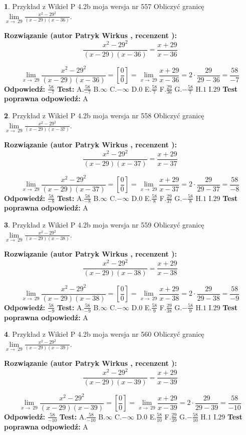 \documentclass[12pt, a4paper]{article}
\theoremstyle{definition} %
\newtheorem{zad}{}
\newcommand{\zadStart}[1]{\begin{zad}#1\newline}
\newcommand{\zadStop}{\end{zad}}
\newcommand{\rozwStart}[2]{\noindent \textbf{Rozwiązanie (autor #1 , recenzent #2): }\newline}
\newcommand{\rozwStop}{\newline}
\newcommand{\odpStart}{\noindent \textbf{Odpowiedź:}\newline}
\newcommand{\odpStop}{\newline}
\newcommand{\testStart}{\noindent \textbf{Test:}\newline}
\newcommand{\testStop}{\newline}
\newcommand{\kluczStart}{\noindent \textbf{Test poprawna odpowiedź:}\newline}
\newcommand{\kluczStop}{\newline}
\begin{document}
\zadStart{Przykład z Wikieł P 4.2b moja wersja nr 557}
Obliczyć granicę $\lim\limits_{x\to\ 29}\frac{x^{2}-29^{2}}{(x-29)(x-36)}$.
\zadStop
\rozwStart{Patryk Wirkus}{}
$$\frac{x^{2}-29^{2}}{(x-29)(x-36)}=\frac{x+29}{x-36}$$

$$\lim\limits_{x\to\ 29}\frac{x^{2}-29^{2}}{(x-29)(x-36)}=[\frac{0}{0}]=\lim\limits_{x\to\ 29}\frac{x+29}{x-36}=2 \cdot \frac{29}{29-36} = \frac{58}{-7}$$
\rozwStop
\odpStart
$\frac{58}{-7}$
\odpStop
\testStart
A.$\frac{58}{-7}$
B.$\infty$
C.$-\infty$
D.$0$
E.$\frac{58}{7}$
F.$\frac{29}{36}$
G.$-\frac{58}{7}$
H.$1$
I.$29$
\testStop
\kluczStart
A
\kluczStop



\zadStart{Przykład z Wikieł P 4.2b moja wersja nr 558}
Obliczyć granicę $\lim\limits_{x\to\ 29}\frac{x^{2}-29^{2}}{(x-29)(x-37)}$.
\zadStop
\rozwStart{Patryk Wirkus}{}
$$\frac{x^{2}-29^{2}}{(x-29)(x-37)}=\frac{x+29}{x-37}$$

$$\lim\limits_{x\to\ 29}\frac{x^{2}-29^{2}}{(x-29)(x-37)}=[\frac{0}{0}]=\lim\limits_{x\to\ 29}\frac{x+29}{x-37}=2 \cdot \frac{29}{29-37} = \frac{58}{-8}$$
\rozwStop
\odpStart
$\frac{58}{-8}$
\odpStop
\testStart
A.$\frac{58}{-8}$
B.$\infty$
C.$-\infty$
D.$0$
E.$\frac{58}{8}$
F.$\frac{29}{37}$
G.$-\frac{58}{8}$
H.$1$
I.$29$
\testStop
\kluczStart
A
\kluczStop



\zadStart{Przykład z Wikieł P 4.2b moja wersja nr 559}
Obliczyć granicę $\lim\limits_{x\to\ 29}\frac{x^{2}-29^{2}}{(x-29)(x-38)}$.
\zadStop
\rozwStart{Patryk Wirkus}{}
$$\frac{x^{2}-29^{2}}{(x-29)(x-38)}=\frac{x+29}{x-38}$$

$$\lim\limits_{x\to\ 29}\frac{x^{2}-29^{2}}{(x-29)(x-38)}=[\frac{0}{0}]=\lim\limits_{x\to\ 29}\frac{x+29}{x-38}=2 \cdot \frac{29}{29-38} = \frac{58}{-9}$$
\rozwStop
\odpStart
$\frac{58}{-9}$
\odpStop
\testStart
A.$\frac{58}{-9}$
B.$\infty$
C.$-\infty$
D.$0$
E.$\frac{58}{9}$
F.$\frac{29}{38}$
G.$-\frac{58}{9}$
H.$1$
I.$29$
\testStop
\kluczStart
A
\kluczStop



\zadStart{Przykład z Wikieł P 4.2b moja wersja nr 560}
Obliczyć granicę $\lim\limits_{x\to\ 29}\frac{x^{2}-29^{2}}{(x-29)(x-39)}$.
\zadStop
\rozwStart{Patryk Wirkus}{}
$$\frac{x^{2}-29^{2}}{(x-29)(x-39)}=\frac{x+29}{x-39}$$

$$\lim\limits_{x\to\ 29}\frac{x^{2}-29^{2}}{(x-29)(x-39)}=[\frac{0}{0}]=\lim\limits_{x\to\ 29}\frac{x+29}{x-39}=2 \cdot \frac{29}{29-39} = \frac{58}{-10}$$
\rozwStop
\odpStart
$\frac{58}{-10}$
\odpStop
\testStart
A.$\frac{58}{-10}$
B.$\infty$
C.$-\infty$
D.$0$
E.$\frac{58}{10}$
F.$\frac{29}{39}$
G.$-\frac{58}{10}$
H.$1$
I.$29$
\testStop
\kluczStart
A
\kluczStop
\end{document}
